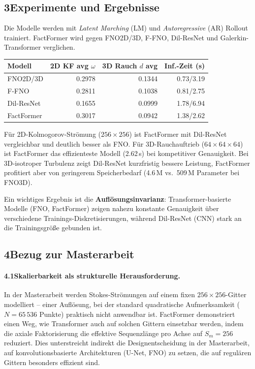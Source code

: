 \documentclass[a4paper,12pt]{article}
\begin{document}
\subsection*{3\quad Experimente und Ergebnisse}

Die Modelle werden mit \emph{Latent Marching} (LM) und \emph{Autoregressive} (AR) Rollout
trainiert. FactFormer wird gegen FNO2D/3D, F-FNO, Dil-ResNet und Galerkin-Transformer verglichen.

\begin{center}
\begin{tabular}{lrrr}
\toprule
\textbf{Modell} & \textbf{2D KF avg $\omega$} & \textbf{3D Rauch $d$ avg} & \textbf{Inf.-Zeit (s)} \\
\midrule
FNO2D/3D & 0.2978 & 0.1344 & 0.73/3.19 \\
F-FNO & 0.2811 & 0.1038 & 0.81/2.75 \\
Dil-ResNet & 0.1655 & 0.0999 & 1.78/6.94 \\
FactFormer & 0.3017 & 0.0942 & 1.38/2.62 \\
\bottomrule
\end{tabular}
\end{center}

Für 2D-Kolmogorov-Strömung ($256\times256$) ist FactFormer mit Dil-ResNet vergleichbar
und deutlich besser als FNO. Für 3D-Rauchauftrieb ($64\times64\times64$) ist FactFormer
das effizienteste Modell (2.62\,s) bei kompetitiver Genauigkeit. Bei 3D-isotroper
Turbulenz zeigt Dil-ResNet kurzfristig bessere Leistung, FactFormer profitiert aber
von geringerem Speicherbedarf (4.6\,M vs.\ 509\,M Parameter bei FNO3D).

Ein wichtiges Ergebnis ist die \textbf{Auflösungsinvarianz}: Transformer-basierte
Modelle (FNO, FactFormer) zeigen nahezu konstante Genauigkeit über verschiedene
Trainings-Diskretisierungen, während Dil-ResNet (CNN) stark an die Trainingsgröße gebunden ist.

\subsection*{4\quad Bezug zur Masterarbeit}

\paragraph{4.1\quad Skalierbarkeit als strukturelle Herausforderung.}
In der Masterarbeit werden Stokes-Strömungen auf einem fixen $256 \times 256$-Gitter
modelliert -- einer Auflösung, bei der standard quadratische Aufmerksamkeit
($N = 65\,536$ Punkte) praktisch nicht anwendbar ist. FactFormer demonstriert
einen Weg, wie Transformer auch auf solchen Gittern einsetzbar werden, indem
die axiale Faktorisierung die effektive Sequenzlänge pro Achse auf $S_m = 256$ reduziert.
Dies unterstreicht indirekt die Designentscheidung in der Masterarbeit, auf
konvolutionsbasierte Architekturen (U-Net, FNO) zu setzen, die auf regulären
Gittern besonders effizient sind.
\end{document}

